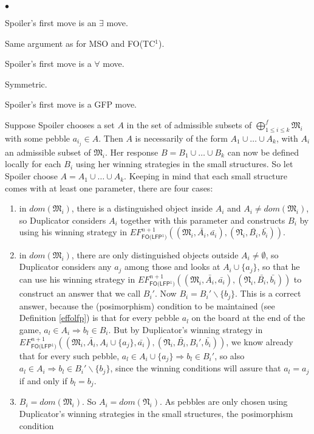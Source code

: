 \documentclass{LMCS}
\newcommand{\frM}{\mathfrak{M}}
\newcommand{\frN}{\mathfrak{N}}
\newcommand{\mso}{\textsf{MSO}\xspace}
\newcommand{\fotc}{\textsf{FO(TC$^1$)}\xspace}
\newcommand{\folfp}{\textsf{FO(LFP$^1$)}\xspace}
\begin{document}
\begin{iteMize}{$\bullet$}
\item   Spoiler's first move is an $\exists$ move.

Same argument as for \mso and \fotc.
\item   Spoiler's first move is a $\forall$ move.

Symmetric.
\item   Spoiler's first move is a GFP move.

Suppose Spoiler chooses a set $A$ in the set of admissible subsets
of $\bigoplus_{1 \leq i\leq k}^f \frM_i$ with some pebble
$a_{i_j} \in A$. Then $A$ is necessarily of the form $A_1 \cup
\ldots \cup A_k$, with $A_i$ an admissible subset of $\frM_i$. Her
response $B=B_1 \cup \ldots \cup B_k$ can now be defined locally
for each $B_i$ using her winning strategies in the small structures.
So let Spoiler choose $A=A_1 \cup \ldots \cup A_k$. Keeping in
mind that each small structure comes with at least one parameter,
there are four cases:
\begin{enumerate}[1)]
\item     in $dom(\frM_i)$, there is a distinguished object inside $A_i$ and $A_i \neq dom(\frM_i)$,
so Duplicator considers $A_i$ together with this parameter and
constructs $B_i$ by using his winning strategy in
$EF_\folfp^{n+1}((\frM_i,\bar{A_i},\bar{a_i}),(\frN_i,\bar{B_i},\bar{b_i}))$.
\item  in $dom(\frM_i)$, there are only distinguished objects
outside $A_i \neq \emptyset$, so Duplicator considers
any $a_j$ among those and looks at
$A_i\cup \{a_j\}$, so that he can use his winning strategy in
$EF_\folfp^{n+1}((\frM_i,\bar{A_i},\bar{a_i}),(\frN_i,\bar{B_i},\bar{b_i}))$
to construct an answer that we call $B_i'$. Now
$B_i=B_i'\backslash \{b_j\}$. This is a correct answer, because
the (posimorphism) condition to be maintained (see Definition \ref{effolfp}) is that for every
pebble $a_l$ on the board at the end of the game, $a_l \in A_i
\Rightarrow b_l \in B_i$. But by Duplicator's winning strategy in
$EF_\folfp^{n+1}((\frM_i,\bar{A_i},A_i\cup
\{a_j\},\bar{a_i}),(\frN_i,\bar{B_i},B_i',\bar{b_i}))$, we
know already that for every such pebble, $a_l \in A_i\cup \{a_j\}
\Rightarrow b_l \in B_i'$, so also $a_l \in A_i \Rightarrow b_l
\in B_i' \backslash \{b_j\}$, since the winning conditions will
  assure that $a_l = a_j$ if and only if $b_l = b_j$.
\item  $B_i=dom(\frM_i)$. So
$A_i=dom(\frN_i)$. As pebbles are only chosen using Duplicator's
winning strategies in the small structures, the posimorphism condition

\end{enumerate}
\end{iteMize}
\end{document}
